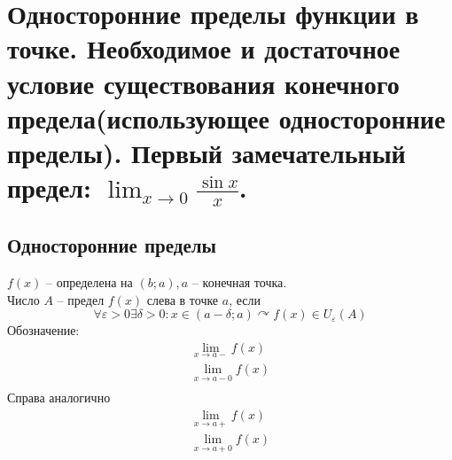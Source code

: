 \documentclass[12pt, fleqn]{article}
\begin{document}
\section{Односторонние пределы функции в точке.  Необходимое и достаточное условие существования конечного предела(использующее односторонние пределы). Первый замечательный предел: $\lim_{x\to 0}$$\frac{\sin x}{x}$.} 
\subsection{Односторонние пределы}
$f(x)$ -- определена на $(b;a), a$ -- конечная точка.\\
Число $A$ -- предел $f(x)$ слева в точке $a$, если
$$\forall \varepsilon >0 \exists\delta>0\colon x\in(a-\delta;a)\curvearrowright f(x)\in U_\varepsilon(A)$$
Обозначение:
\begin{multline*}
	\lim_{x \to a-}f(x)\\
	\lim_{x\to a-0}f(x)\\
\end{multline*}
Справа аналогично\\
\begin{multline*}
	\lim_{x \to a+}f(x)\\
	\lim_{x\to a+0}f(x)\\
\end{multline*}
\\
\end{document}
